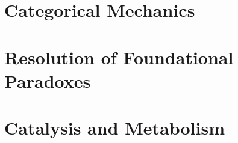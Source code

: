 \documentclass[12pt, openright, twoside, a4paper]{book}
\begin{document}
\frontmatter






\tableofcontents
\listoffigures
\listoftables

\mainmatter

\part{Categorical Mechanics}
\label{part:foundations}






\part{Resolution of Foundational Paradoxes}
\label{part:paradoxes}






\part{Catalysis and Metabolism}
\label{part:catalysis}






\end{document}
